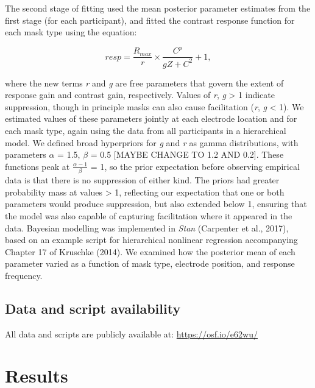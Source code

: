\documentclass[]{article}
\begin{document}
The second stage of fitting used the mean posterior parameter estimates from the first stage (for each participant), and fitted the contrast response function for each mask type using the equation:

\begin{equation}
\label{eq:GC2}
resp = \frac{R_{max}}{r} \times \frac{C^p}{gZ + C^2} + 1,
\end{equation}

where the new terms \emph{r} and \emph{g} are free parameters that govern the extent of response gain and contrast gain, respectively. Values of \emph{r}, \emph{g} \textgreater{} 1 indicate suppression, though in principle masks can also cause facilitation (\emph{r}, \emph{g} \textless{} 1). We estimated values of these parameters jointly at each electrode location and for each mask type, again using the data from all participants in a hierarchical model. We defined broad hyperpriors for \emph{g} and \emph{r} as gamma distributions, with parameters \(\alpha\) = 1.5, \(\beta\) = 0.5 {[}MAYBE CHANGE TO 1.2 AND 0.2{]}. These functions peak at \(\frac{\alpha-1}{\beta}\) = 1, so the prior expectation before observing empirical data is that there is no suppression of either kind. The priors had greater probability mass at values \textgreater{} 1, reflecting our expectation that one or both parameters would produce suppression, but also extended below 1, ensuring that the model was also capable of capturing facilitation where it appeared in the data. Bayesian modelling was implemented in \emph{Stan} (Carpenter et al., 2017), based on an example script for hierarchical nonlinear regression accompanying Chapter 17 of Kruschke (2014). We examined how the posterior mean of each parameter varied as a function of mask type, electrode position, and response frequency.

\hypertarget{data-and-script-availability}{%
\subsection{Data and script availability}\label{data-and-script-availability}}

All data and scripts are publicly available at: \url{https://osf.io/e62wu/}

\hypertarget{results}{%
\section{Results}\label{results}}
\end{document}
